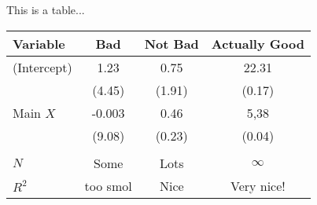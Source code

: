 \begin{center}
This is a table... \\
\smallskip
\begin{tabular}{lccc}
\hline \hline
Variable & Bad & Not Bad & Actually Good \\
\hline
(Intercept) &   1.23   &   0.75    &   22.31   \\
                  & (4.45)  & (1.91)    &  (0.17) \\
Main $X$   &  -0.003 &  0.46    &  5,38    \\
                  & (9.08)  & (0.23)    &  (0.04) \\
                 &            &              &                \\
$N$          & Some  &  Lots     &   $\infty$  \\
$R^{2}$    & too smol & Nice & Very nice! \\
\hline \hline
\end{tabular}
\end{center}